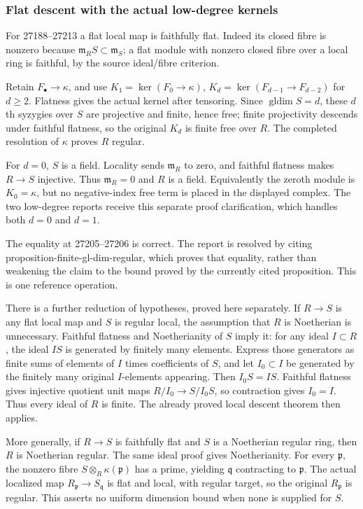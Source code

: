 \subsubsection{Flat descent with the actual low-degree kernels}\label{flat-descent-with-the-actual-low-degree-kernels}

For 27188--27213 a flat local map is faithfully flat. Indeed its closed fibre is nonzero because \(\mathfrak m_RS\subset\mathfrak m_S\); a flat module with nonzero closed fibre over a local ring is faithful, by the source ideal/fibre criterion.

Retain \(F_\bullet\to\kappa\), and use \(K_1=\ker(F_0\to\kappa)\), \(K_d=\ker(F_{d-1}\to F_{d-2})\) for \(d\ge2\). Flatness gives the actual kernel after tensoring. Since \(\operatorname{gldim}S=d\), these \(d\)th syzygies over \(S\) are projective and finite, hence free; finite projectivity descends under faithful flatness, so the original \(K_d\) is finite free over \(R\). The completed resolution of \(\kappa\) proves \(R\) regular.

For \(d=0\), \(S\) is a field. Locality sends \(\mathfrak m_R\) to zero, and faithful flatness makes \(R\to S\) injective. Thus \(\mathfrak m_R=0\) and \(R\) is a field. Equivalently the zeroth module is \(K_0=\kappa\), but no negative-index free term is placed in the displayed complex. The two low-degree reports receive this separate proof clarification, which handles both \(d=0\) and \(d=1\).

The equality at 27205--27206 is correct. The report is resolved by citing proposition-finite-gl-dim-regular, which proves that equality, rather than weakening the claim to the bound proved by the currently cited proposition. This is one reference operation.

There is a further reduction of hypotheses, proved here separately. If \(R\to S\) is any flat local map and \(S\) is regular local, the assumption that \(R\) is Noetherian is unnecessary. Faithful flatness and Noetherianity of \(S\) imply it: for any ideal \(I\subset R\), the ideal \(IS\) is generated by finitely many elements. Express those generators as finite sums of elements of \(I\) times coefficients of \(S\), and let \(I_0\subset I\) be generated by the finitely many original \(I\)-elements appearing. Then \(I_0S=IS\). Faithful flatness gives injective quotient unit maps \(R/I_0\to S/I_0S\), so contraction gives \(I_0=I\). Thus every ideal of \(R\) is finite. The already proved local descent theorem then applies.

More generally, if \(R\to S\) is faithfully flat and \(S\) is a Noetherian regular ring, then \(R\) is Noetherian regular. The same ideal proof gives Noetherianity. For every \(\mathfrak p\), the nonzero fibre \(S\otimes_R\kappa(\mathfrak p)\) has a prime, yielding \(\mathfrak q\) contracting to \(\mathfrak p\). The actual localized map \(R_{\mathfrak p}\to S_{\mathfrak q}\) is flat and local, with regular target, so the original \(R_{\mathfrak p}\) is regular. This asserts no uniform dimension bound when none is supplied for \(S\).


